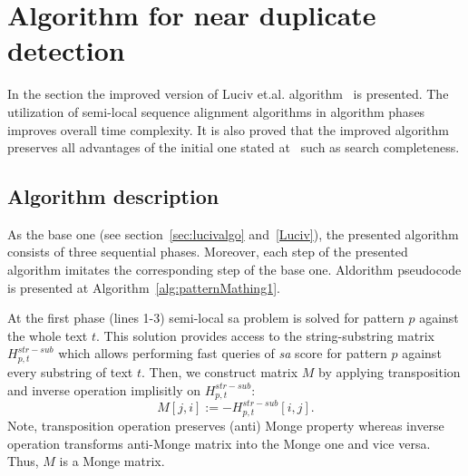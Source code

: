 \section{Algorithm for near duplicate detection}
\label{section:luciv}

In the section the improved version of Luciv et.al. algorithm~\cite{luciv2019interactive} is presented.
The utilization of semi-local sequence alignment algorithms in algorithm phases improves overall time complexity.
It is also proved that the improved algorithm preserves all advantages of the initial one stated at~\cite{luciv2019interactive} such as search completeness.

\subsection{Algorithm description}

As the base one (see section~\ref{sec:lucivalgo} and~\ref{Luciv}), the presented algorithm consists of three sequential phases.
Moreover, each step of the presented algorithm imitates the corresponding step of the base one.
Aldorithm pseudocode is presented at Algorithm~\ref{alg:patternMathing1}.

At the first phase (lines 1-3) semi-local sa problem is solved for pattern $p$ against the whole text $t$.
This solution provides access to the string-substring matrix $H^{str-sub}_{p,t}$ which allows performing fast queries of \emph{sa} score for pattern $p$ against every substring of text $t$.
Then, we construct matrix $M$ by applying transposition and inverse operation implisitly on $H^{str-sub}_{p,t}$:
$$M[j,i]:= -H^{str-sub}_{p,t}[i,j].$$
Note, transposition operation preserves (anti) Monge property whereas inverse operation transforms anti-Monge matrix into the Monge one and vice versa. 
Thus, $M$ is a Monge matrix.

